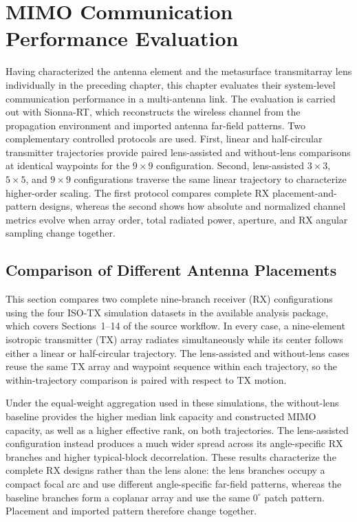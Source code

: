 \chapter{MIMO Communication Performance Evaluation}

Having characterized the antenna element and the metasurface transmitarray lens individually in the preceding chapter, this chapter evaluates their system-level communication performance in a multi-antenna link. The evaluation is carried out with Sionna-RT, which reconstructs the wireless channel from the propagation environment and imported antenna far-field patterns. Two complementary controlled protocols are used. First, linear and half-circular transmitter trajectories provide paired lens-assisted and without-lens comparisons at identical waypoints for the $9\times9$ configuration. Second, lens-assisted $3\times3$, $5\times5$, and $9\times9$ configurations traverse the same linear trajectory to characterize higher-order scaling. The first protocol compares complete RX placement-and-pattern designs, whereas the second shows how absolute and normalized channel metrics evolve when array order, total radiated power, aperture, and RX angular sampling change together.

\section{Comparison of Different Antenna Placements}\label{sec:comparison-antenna-placements}

This section compares two complete nine-branch receiver (RX) configurations using the four ISO-TX simulation datasets in the available analysis package, which covers Sections~1--14 of the source workflow. In every case, a nine-element isotropic transmitter (TX) array radiates simultaneously while its center follows either a linear or half-circular trajectory. The lens-assisted and without-lens cases reuse the same TX array and waypoint sequence within each trajectory, so the within-trajectory comparison is paired with respect to TX motion.

Under the equal-weight aggregation used in these simulations, the without-lens baseline provides the higher median link capacity and constructed MIMO capacity, as well as a higher effective rank, on both trajectories. The lens-assisted configuration instead produces a much wider spread across its angle-specific RX branches and higher typical-block decorrelation. These results characterize the complete RX designs rather than the lens alone: the lens branches occupy a compact focal arc and use different angle-specific far-field patterns, whereas the baseline branches form a coplanar array and use the same $0^\circ$ patch pattern. Placement and imported pattern therefore change together.


